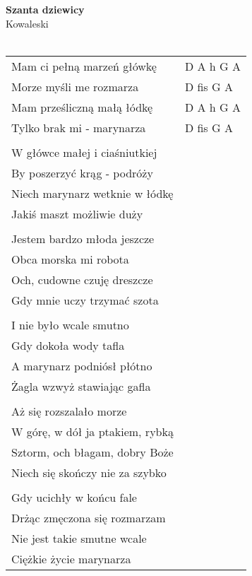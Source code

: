 \documentclass[a5paper]{article}
\begin{document}


\noindent
\fontsize{12pt}{15pt}\selectfont
\textbf{Szanta dziewicy} \\
\fontsize{8pt}{10pt}\selectfont
Kowaleski \\ \\
\fontsize{10pt}{12pt}\selectfont
{}
\begin{tabular}{@{}p{6.50cm}p{3cm}@{}}
\noindent
Mam ci pełną marzeń główkę & D A h G A \\
Morze myśli me rozmarza & D fis G A \\
Mam prześliczną małą łódkę & D A h G A \\
Tylko brak mi - marynarza & D fis G A \\ \\

W główce małej i ciaśniutkiej \\
By poszerzyć krąg - podróży \\
Niech marynarz wetknie w łódkę \\
Jakiś maszt możliwie duży \\ \\

Jestem bardzo młoda jeszcze \\
Obca morska mi robota \\
Och, cudowne czuję dreszcze \\
Gdy mnie uczy trzymać szota \\ \\

I nie było wcale smutno \\
Gdy dokoła wody tafla \\
A marynarz podniósł płótno \\
Żagla wzwyż stawiając gafla \\ \\

Aż się rozszalało morze \\
W górę, w dół ja ptakiem, rybką \\
Sztorm, och błagam, dobry Boże \\
Niech się skończy nie za szybko \\ \\

Gdy ucichły w końcu fale \\
Drżąc zmęczona się rozmarzam \\
Nie jest takie smutne wcale \\
Ciężkie życie marynarza
\end{tabular}
\end{document}
